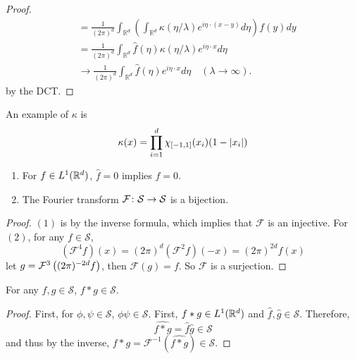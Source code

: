 \begin{enumerate}[label=\arabic*.]
\begin{proof}
\begin{equation*}
\begin{aligned}
				& =\frac{1}{(2 \pi)^d} \int_{\mathbb{R}^d}\left(\int_{\mathbb{R}^d} \kappa(\eta / \lambda) e^{i \eta \cdot(x-y)} d \eta\right) f(y) d y \\
				& =\frac{1}{(2 \pi)^d} \int_{\mathbb{R}^d} \widehat{f}(\eta) \kappa(\eta / \lambda) e^{i \eta \cdot x} d \eta \\
				& \rightarrow \frac{1}{(2 \pi)^d} \int_{\mathbb{R}^d} \widehat{f}(\eta) e^{i \eta \cdot x} d \eta \quad(\lambda \rightarrow \infty) .
			\end{aligned}
		\end{equation*}
		by the DCT.
	\end{proof}
	\begin{rmk}
		An example of $\kappa$ is
		\begin{equation*}
			\kappa(x) = \prod_{i=1}^d\chi_{[-1,1]}(x_i)(1-\left\lvert x_i\right\lvert)
		\end{equation*}
	\end{rmk}
	\begin{cor}
		\begin{enumerate}[label=(\arabic*)]
			\item For $f \in L^1(\mathbb{R}^d)$, $\widehat{f} = 0$ implies $f = 0$.
			\item The Fourier transform $\mathcal{F} \colon \mathcal{S} \rightarrow \mathcal{S}$ is a bijection.
		\end{enumerate}
	\end{cor}
	\begin{proof}
		$(1)$ is by the inverse formula, which implies that $\mathcal{F}$ is an injective. For $(2)$, for any $f \in \mathcal{S}$,
		\begin{equation*}
			\left(\mathcal{F}^4 f\right)(x)=(2 \pi)^d\left(\mathcal{F}^2 f\right)(-x)=(2 \pi)^{2 d} f(x)
		\end{equation*}
		let $g = \mathcal{F}^3\left((2\pi)^{-2d}f\right)$, then $\mathcal{F}(g) = f$. So $\mathcal{F}$ is a surjection.
	\end{proof}

	\begin{prop}
		For any $f,g \in \mathcal{S}$, $f*g \in \mathcal{S}$.
	\end{prop}
	\begin{proof}
		First, for $\phi,\psi \in \mathcal{S}$, $\phi \psi \in \mathcal{S}$. First, $f * g \in L^1(\mathbb{R}^d)$ and $\widehat{f},\widehat{g} \in \mathcal{S}$. Therefore,
		\begin{equation*}
			\widehat{f * g} = \widehat{f}\widehat{g}\in \mathcal{S}
		\end{equation*}
		and thus by the inverse, $f * g = \mathcal{F}^{-1}(\widehat{f * g}) \in \mathcal{S}$.
	\end{proof}


\end{enumerate}
